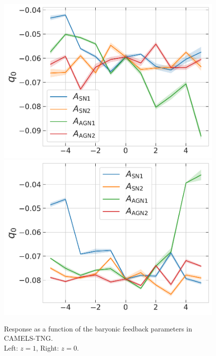 \begin{figure}[htbp]
\centering
\includegraphics[width=0.49\linewidth]{plots/CAMELS_I_q0_sn18.pdf}
\includegraphics[width=0.49\linewidth]{plots/CAMELS_I_q0_sn33.pdf}
\caption[]{Response as a function of the baryonic feedback parameters in CAMELS-TNG. \\\hspace{\textwidth}Left: $z=1$, Right: $z=0$.}
\label{fig:camels-q0q1}
\end{figure}









